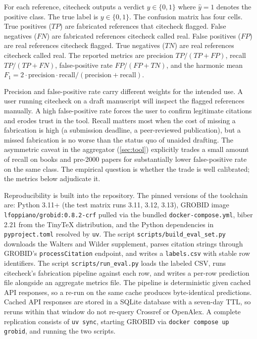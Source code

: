 \documentclass[12pt]{article}
\begin{document}
For each reference, citecheck outputs a verdict $\hat{y} \in \{0, 1\}$ where $\hat{y}=1$ denotes the positive class. The true label is $y \in \{0, 1\}$. The confusion matrix has four cells. True positives ($TP$) are fabricated references that citecheck flagged. False negatives ($FN$) are fabricated references citecheck called real. False positives ($FP$) are real references citecheck flagged. True negatives ($TN$) are real references citecheck called real. The reported metrics are precision $TP/(TP+FP)$, recall $TP/(TP+FN)$, false-positive rate $FP/(FP+TN)$, and the harmonic mean $F_1 = 2 \cdot \text{precision} \cdot \text{recall} / (\text{precision} + \text{recall})$.

Precision and false-positive rate carry different weights for the intended use. A user running citecheck on a draft manuscript will inspect the flagged references manually. A high false-positive rate forces the user to confirm legitimate citations and erodes trust in the tool. Recall matters most when the cost of missing a fabrication is high (a submission deadline, a peer-reviewed publication), but a missed fabrication is no worse than the status quo of unaided drafting. The asymmetric caveat in the aggregator (\cref{sec:tool}) explicitly trades a small amount of recall on books and pre-2000 papers for substantially lower false-positive rate on the same class. The empirical question is whether the trade is well calibrated; the metrics below adjudicate it.

\begin{sloppypar}
Reproducibility is built into the repository. The pinned versions of the toolchain are: Python 3.11+ (the test matrix runs 3.11, 3.12, 3.13), GROBID image \texttt{lfoppiano/grobid:0.8.2-crf} pulled via the bundled \texttt{docker-compose.yml}, biber 2.21 from the TinyTeX distribution, and the Python dependencies in \texttt{pyproject.toml} resolved by \texttt{uv}. The script \texttt{scripts/build\_eval\_set.py} downloads the Walters and Wilder supplement, parses citation strings through GROBID's \texttt{processCitation} endpoint, and writes a \texttt{labels.csv} with stable row identifiers. The script \texttt{scripts/run\_eval.py} loads the labeled CSV, runs citecheck's fabrication pipeline against each row, and writes a per-row prediction file alongside an aggregate metrics file. The pipeline is deterministic given cached API responses, so a re-run on the same cache produces byte-identical predictions. Cached API responses are stored in a SQLite database with a seven-day TTL, so reruns within that window do not re-query Crossref or OpenAlex. A complete replication consists of \texttt{uv sync}, starting GROBID via \texttt{docker compose up grobid}, and running the two scripts.
\end{sloppypar}
\end{document}
